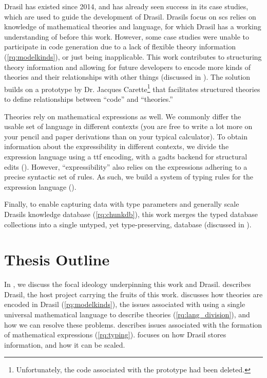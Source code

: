 Drasil has existed since 2014, and has already seen success in its case studies,
which are used to guide the development of Drasil. Drasils focus on \acs{scs}
relies on knowledge of mathematical theories and language, for which Drasil has
a working understanding of before this work. However, some case studies were
unable to participate in code generation due to a lack of flexible theory
information (\ref{rq:modelkinds}), or just being inapplicable. This work
contributes to structuring theory information and allowing for future developers
to encode more kinds of theories and their relationships with other things
(discussed in ). The solution builds on a prototype by Dr.
Jacques Carette\footnote{Unfortunately, the code associated with the prototype
had been deleted.} that facilitates structured theories to define relationships
between ``code'' and ``theories.''

Theories rely on mathematical expressions as well. We commonly differ the usable
set of language in different contexts (you are free to write a lot more on your
pencil and paper derivations than on your typical calculator). To obtain
information about the expressibility in different contexts, we divide the
expression language using a \acs{ttf} \cite{Carette2009} encoding, with a
\acsp{gadt} backend for structural edits (). However,
``expressibility'' also relies on the expressions adhering to a precise
syntactic set of rules. As such, we build a system of typing rules for the
expression language ().

Finally, to enable capturing data with type parameters and generally scale
Drasils knowledge database (\ref{rq:chunkdb}), this work merges the typed
database collections into a single untyped, yet type-preserving, database
(discussed in ).

\section{Thesis Outline}
\label{sec:intro:outline}

In , we discuss the focal ideology underpinning this work
and Drasil.  describes Drasil, the host project carrying the
fruits of this work.  discusses how theories are encoded
in Drasil (\ref{rq:modelkinds}), the issues associated with using a single
universal mathematical language to describe theories (\ref{rq:lang_division}),
and how we can resolve these problems.  describes issues
associated with the formation of mathematical expressions (\ref{rq:typing}).
 focuses on how Drasil stores information, and how it
can be scaled.
